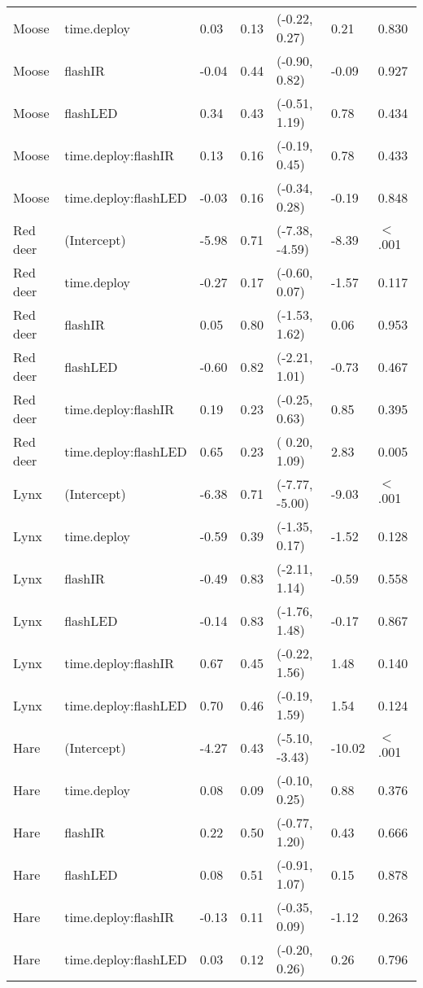 \begin{table}[ht]
\begin{tabular}{lllllll}
  Moose & time.deploy & 0.03 & 0.13 & (-0.22,  0.27) & 0.21 & 0.830  \\ 
  Moose & flashIR & -0.04 & 0.44 & (-0.90,  0.82) & -0.09 & 0.927  \\ 
  Moose & flashLED & 0.34 & 0.43 & (-0.51,  1.19) & 0.78 & 0.434  \\ 
  Moose & time.deploy:flashIR & 0.13 & 0.16 & (-0.19,  0.45) & 0.78 & 0.433  \\ 
  Moose & time.deploy:flashLED & -0.03 & 0.16 & (-0.34,  0.28) & -0.19 & 0.848  \\ 
  Red deer & (Intercept) & -5.98 & 0.71 & (-7.38, -4.59) & -8.39 & $<$ .001 \\ 
  Red deer & time.deploy & -0.27 & 0.17 & (-0.60,  0.07) & -1.57 & 0.117  \\ 
  Red deer & flashIR & 0.05 & 0.80 & (-1.53,  1.62) & 0.06 & 0.953  \\ 
  Red deer & flashLED & -0.60 & 0.82 & (-2.21,  1.01) & -0.73 & 0.467  \\ 
  Red deer & time.deploy:flashIR & 0.19 & 0.23 & (-0.25,  0.63) & 0.85 & 0.395  \\ 
  Red deer & time.deploy:flashLED & 0.65 & 0.23 & ( 0.20,  1.09) & 2.83 & 0.005  \\ 
  Lynx & (Intercept) & -6.38 & 0.71 & (-7.77, -5.00) & -9.03 & $<$ .001 \\ 
  Lynx & time.deploy & -0.59 & 0.39 & (-1.35,  0.17) & -1.52 & 0.128  \\ 
  Lynx & flashIR & -0.49 & 0.83 & (-2.11,  1.14) & -0.59 & 0.558  \\ 
  Lynx & flashLED & -0.14 & 0.83 & (-1.76,  1.48) & -0.17 & 0.867  \\ 
  Lynx & time.deploy:flashIR & 0.67 & 0.45 & (-0.22,  1.56) & 1.48 & 0.140  \\ 
  Lynx & time.deploy:flashLED & 0.70 & 0.46 & (-0.19,  1.59) & 1.54 & 0.124  \\ 
  Hare & (Intercept) & -4.27 & 0.43 & (-5.10, -3.43) & -10.02 & $<$ .001 \\ 
  Hare & time.deploy & 0.08 & 0.09 & (-0.10,  0.25) & 0.88 & 0.376  \\ 
  Hare & flashIR & 0.22 & 0.50 & (-0.77,  1.20) & 0.43 & 0.666  \\ 
  Hare & flashLED & 0.08 & 0.51 & (-0.91,  1.07) & 0.15 & 0.878  \\ 
  Hare & time.deploy:flashIR & -0.13 & 0.11 & (-0.35,  0.09) & -1.12 & 0.263  \\ 
  Hare & time.deploy:flashLED & 0.03 & 0.12 & (-0.20,  0.26) & 0.26 & 0.796  \\ 

\end{tabular}
\end{table}
